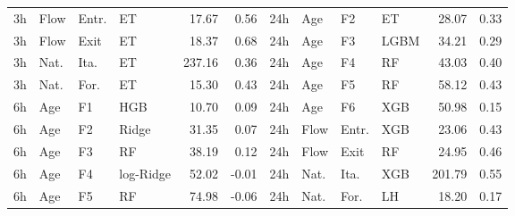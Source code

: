 \begin{table}[!t]
\begin{tabular}{@{}rlllrr@{\hspace{0.8em}}rlllrr@{}}
3h & Flow & Entr. & ET & 17.67 & 0.56 & 24h & Age & F2 & ET & 28.07 & 0.33 \\
3h & Flow & Exit & ET & 18.37 & 0.68 & 24h & Age & F3 & LGBM & 34.21 & 0.29 \\
3h & Nat. & Ita. & ET & 237.16 & 0.36 & 24h & Age & F4 & RF & 43.03 & 0.40 \\
3h & Nat. & For. & ET & 15.30 & 0.43 & 24h & Age & F5 & RF & 58.12 & 0.43 \\
6h & Age & F1 & HGB & 10.70 & 0.09 & 24h & Age & F6 & XGB & 50.98 & 0.15 \\
6h & Age & F2 & Ridge & 31.35 & 0.07 & 24h & Flow & Entr. & XGB & 23.06 & 0.43 \\
6h & Age & F3 & RF & 38.19 & 0.12 & 24h & Flow & Exit & RF & 24.95 & 0.46 \\
6h & Age & F4 & log-Ridge & 52.02 & -0.01 & 24h & Nat. & Ita. & XGB & 201.79 & 0.55 \\
6h & Age & F5 & RF & 74.98 & -0.06 & 24h & Nat. & For. & LH & 18.20 & 0.17 \\
\bottomrule
\end{tabular}
\vspace{-1.1em}
\end{table}
